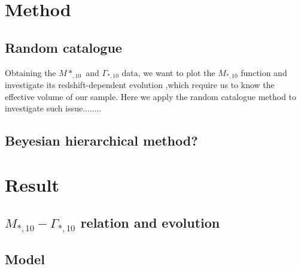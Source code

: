 \documentclass[fleqn,usenatbib]{mnras}
\begin{document}
\section{Method}
\subsection{Random catalogue}
Obtaining the $M*_{,10}$ and $\Gamma_{*,10}$ data, we want to plot the $M_{*,10}$ function and investigate its redshift-dependent evolution ,which require us to know the effective volume of our sample. Here we apply the random catalogue method to investigate such issue........
\subsection{Beyesian hierarchical method?}

\section{Result}
\subsection{$M_{*,10}-\Gamma_{*,10}$ relation and evolution}
\subsection{Model}



\end{document}
